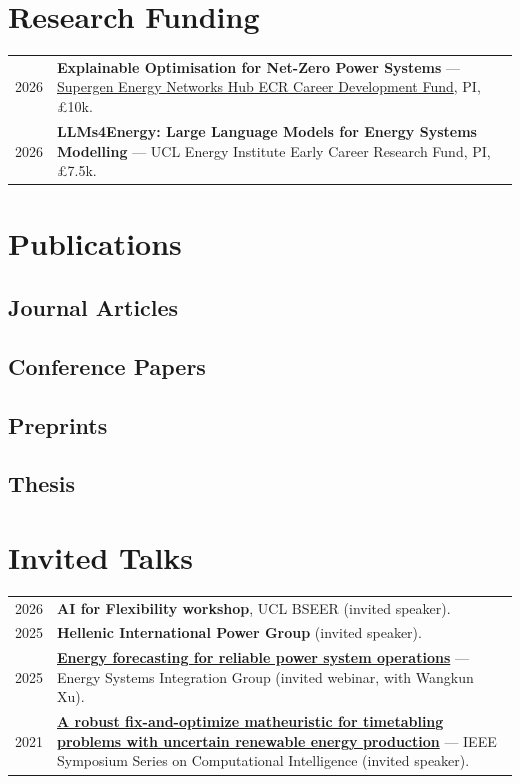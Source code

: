 \documentclass[11pt,a4paper]{article}
\makeatletter
\newlength{\datecolwidth}
\newenvironment{entrylist}{%
  \begin{longtable}{@{}p{\datecolwidth}@{\hspace{0.8em}}p{\dimexpr\linewidth-\datecolwidth-0.8em\relax}@{}}%
}{\end{longtable}}
\newcommand{\labelstyle}[1]{\textsc{#1}}   %
\newcommand{\entrylabel}[2]{%
  \labelstyle{#1} & #2\\[0.8em]
}
\makeatother
\begin{document}
\section*{Research Funding}
\begin{entrylist}
  \entrylabel{2026}{\textbf{Explainable Optimisation for Net-Zero Power Systems} --- \href{https://supergenen.org/funding-2-2/}{Supergen Energy Networks Hub ECR Career Development Fund}, PI, \pounds10k.}
  \entrylabel{2026}{\textbf{LLMs4Energy: Large Language Models for Energy Systems Modelling} --- UCL Energy Institute Early Career Research Fund, PI, \pounds7.5k.}
\end{entrylist}

\newpage
\section*{Publications}

\nocite{*}

\subsection*{Journal Articles}
\printbibliography[keyword=peerjournal,heading=none]

\subsection*{Conference Papers}
\printbibliography[keyword=peerconf,heading=none]

\subsection*{Preprints}
\printbibliography[keyword=preprint,heading=none]

\subsection*{Thesis}
\printbibliography[heading = none, keyword=monographs]

\section*{Invited Talks}
\begin{entrylist}
  \entrylabel{2026}{\textbf{AI for Flexibility workshop}, UCL BSEER (invited speaker).}
  \entrylabel{2025}{\textbf{Hellenic International Power Group} (invited speaker).}
  \entrylabel{2025}{\href{https://www.esig.energy/event/reliable-energy-forecasting/}{\textbf{Energy forecasting for reliable power system operations}} --- Energy Systems Integration Group (invited webinar, with Wangkun Xu).}
  \entrylabel{2021}{\href{https://hal.science/hal-03449920}{\textbf{A robust fix-and-optimize matheuristic for timetabling problems with uncertain renewable energy production}} --- IEEE Symposium Series on Computational Intelligence (invited speaker).}
\end{entrylist}
\end{document}
